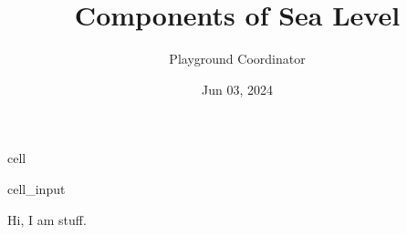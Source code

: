 \documentclass[letterpaper,10pt,english]{jupyterBook}
\title{Components of Sea Level}
\date{Jun 03, 2024}
\author{Playground Coordinator}
\begin{document}
\pagestyle{empty}
\sphinxmaketitle
\pagestyle{plain}
\sphinxtableofcontents
\pagestyle{normal}
\label{\detokenize{notebooks/regional_and_local/SL_Components_intra-annual::doc}}


\begin{sphinxuseclass}{cell}\begin{sphinxVerbatimInput}

\begin{sphinxuseclass}{cell_input}
\begin{sphinxVerbatim}[commandchars=\\\{\}]
\end{sphinxVerbatim}

\end{sphinxuseclass}\end{sphinxVerbatimInput}

\end{sphinxuseclass}
\sphinxAtStartPar
Hi, I am stuff.
\end{document}
